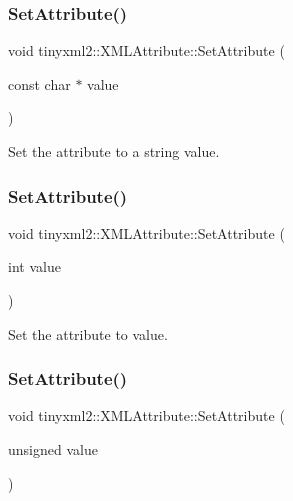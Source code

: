 \subsubsection{\texorpdfstring{Set\+Attribute()}{SetAttribute()}\hspace{0.1cm}{\footnotesize\ttfamily [1/7]}}
{\footnotesize\ttfamily void tinyxml2\+::\+X\+M\+L\+Attribute\+::\+Set\+Attribute (\begin{DoxyParamCaption}\item[{const char $\ast$}]{value }\end{DoxyParamCaption})}



Set the attribute to a string value. 

\mbox{\label{classtinyxml2_1_1_x_m_l_attribute_ad86d7d7058d76761c3a80662566a57e5}} 
\subsubsection{\texorpdfstring{Set\+Attribute()}{SetAttribute()}\hspace{0.1cm}{\footnotesize\ttfamily [2/7]}}
{\footnotesize\ttfamily void tinyxml2\+::\+X\+M\+L\+Attribute\+::\+Set\+Attribute (\begin{DoxyParamCaption}\item[{int}]{value }\end{DoxyParamCaption})}



Set the attribute to value. 

\mbox{\label{classtinyxml2_1_1_x_m_l_attribute_ae70468c0f6df2748ba3529c716999fae}} 
\subsubsection{\texorpdfstring{Set\+Attribute()}{SetAttribute()}\hspace{0.1cm}{\footnotesize\ttfamily [3/7]}}
{\footnotesize\ttfamily void tinyxml2\+::\+X\+M\+L\+Attribute\+::\+Set\+Attribute (\begin{DoxyParamCaption}\item[{unsigned}]{value }\end{DoxyParamCaption})}



